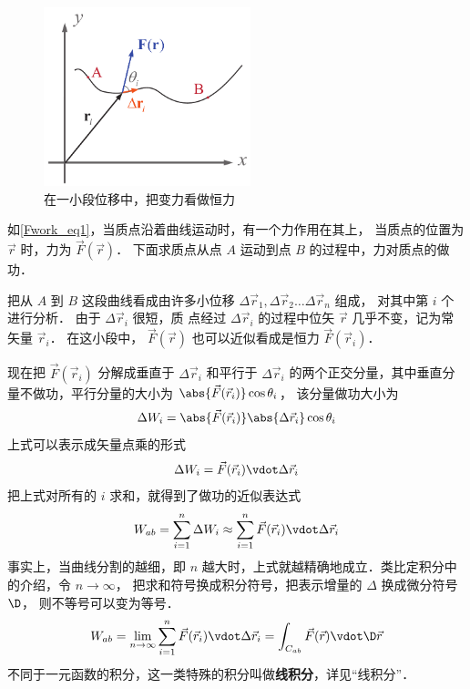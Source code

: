 

\begin{figure}[ht]
\centering
\includegraphics[width=6cm]{./figures/Fwork.pdf}
\caption{在一小段位移中，把变力看做恒力}\label{Fwork_eq1}
\end{figure}

如\autoref{Fwork_eq1}，当质点沿着曲线运动时，有一个力作用在其上， 当质点的位置为 $\vec r$ 时，力为 $\vec F(\vec r)$． 下面求质点从点 $A$ 运动到点 $B$ 的过程中，力对质点的做功．

把从 $A$ 到 $B$ 这段曲线看成由许多小位移 $\Delta {\vec r_1}, \Delta {\vec r_2}\dots\Delta {\vec r_n}$ 组成， 对其中第 $i$ 个进行分析． 由于 $\Delta {\vec r_i}$ 很短，质
点经过 $\Delta {\vec r_i}$ 的过程中位矢 $\vec r$ 几乎不变，记为常矢量 ${\vec r_i}$． 在这小段中，  $\vec F(\vec r)$ 也可以近似看成是恒力 $\vec F(\vec r_i)$． 

现在把 $\vec F(\vec r_i)$ 分解成垂直于 $\Delta {\vec r_i}$ 和平行于 $\Delta {\vec r_i}$ 的两个正交分量，其中垂直分量不做功，平行分量的大小为 $ \abs{\vec F(\vec r_i)} \cos \theta _i$， 该分量做功大小为
\begin{equation}
\Delta {W_i} = \abs{\vec F(\vec r_i)} \abs{\Delta \vec r_i} \cos \theta _i
\end{equation}
上式可以表示成矢量点乘的形式
\begin{equation}\label{Fwork_eq2}
\Delta {W_i} = \vec F(\vec r_i) \vdot \Delta \vec r_i
\end{equation}
把上式对所有的 $i$ 求和，就得到了做功的近似表达式
\begin{equation}
W_{ab} = \sum_{i = 1}^n \Delta {W_i}  \approx \sum_{i = 1}^n \vec F(\vec r_i) \vdot \Delta \vec r_i 
\end{equation} 
事实上，当曲线分割的越细，即 $n$ 越大时，上式就越精确地成立．类比定积分中的介绍，令 $n \to \infty $， 把求和符号换成积分符号，把表示增量的 $\Delta $ 换成微分符号 $\D$， 则不等号可以变为等号．
\begin{equation}
{W_{ab}} = \lim_{n \to \infty } \sum\limits_{i = 1}^n \vec F(\vec r_i) \vdot \Delta \vec r_i  = \int_{C_{ab}} \vec F(\vec r) \vdot \D \vec r
\end{equation} 
不同于一元函数的积分，这一类特殊的积分叫做\textbf{线积分}，详见“线积分”．

